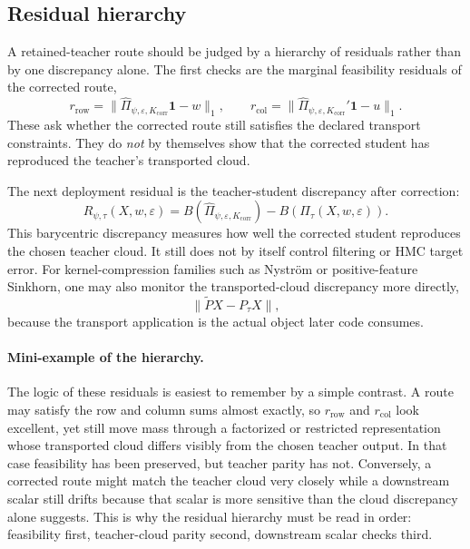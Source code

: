 \subsection{Residual hierarchy}
\label{sec:bf-learned-ot-residuals}

A retained-teacher route should be judged by a hierarchy of residuals rather than
by one discrepancy alone.  The first checks are the marginal feasibility residuals
of the corrected route,
\begin{equation}
\label{eq:bf-learned-ot-row-col-residuals}
  r_{\mathrm{row}}
  =
  \|\widehat\Pi_{\psi,\varepsilon,K_{\mathrm{corr}}}\mathbf 1-w\|_1,
  \qquad
  r_{\mathrm{col}}
  =
  \|\widehat\Pi_{\psi,\varepsilon,K_{\mathrm{corr}}}'\mathbf 1-u\|_1.
\end{equation}
These ask whether the corrected route still satisfies the declared transport
constraints.  They do \emph{not} by themselves show that the corrected student has
reproduced the teacher's transported cloud.

The next deployment residual is the teacher-student discrepancy after correction:
\begin{equation}
\label{eq:bf-learned-ot-residual}
  R_{\psi,\tau}(X,w,\varepsilon)
  =
  B(\widehat\Pi_{\psi,\varepsilon,K_{\mathrm{corr}}})
  -
  B(\Pi_\tau(X,w,\varepsilon)).
\end{equation}
This barycentric discrepancy measures how well the corrected student reproduces the
chosen teacher cloud.  It still does not by itself control filtering or HMC target
error.  For kernel-compression families such as Nystr{\"o}m or positive-feature
Sinkhorn, one may also monitor the transported-cloud discrepancy more directly,
\begin{equation}
\label{eq:bf-learned-ot-transport-discrepancy}
  \|\widetilde P X - P_\tau X\|,
\end{equation}
because the transport application is the actual object later code consumes.

\paragraph{Mini-example of the hierarchy.}
The logic of these residuals is easiest to remember by a simple contrast.  A route
may satisfy the row and column sums almost exactly, so \(r_{\mathrm{row}}\) and
\(r_{\mathrm{col}}\) look excellent, yet still move mass through a factorized or
restricted representation whose transported cloud differs visibly from the chosen
teacher output.  In that case feasibility has been preserved, but teacher parity
has not.  Conversely, a corrected route might match the teacher cloud very closely
while a downstream scalar still drifts because that scalar is more sensitive than the
cloud discrepancy alone suggests.  This is why the residual hierarchy must be read
in order: feasibility first, teacher-cloud parity second, downstream scalar checks
third.

